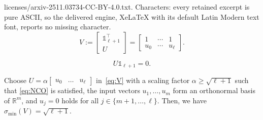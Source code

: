 \documentclass[10pt,a4paper]{amsart}
\newcommand{\R}{\ensuremath{\mathbb R}}
\newcommand{\dd}{\ell}
\newcommand{\one}{\mathds{1}}
\begin{document}
licenses/arxiv-2511.03734-CC-BY-4.0.txt. Characters: every retained excerpt is pure ASCII, so the delivered engine, XeLaTeX with its default Latin Modern text font, reports no missing character.
    \begin{equation}\label{eq:V}
        V := \begin{bmatrix}
            \one_{\dd+1}^\top \\ U
        \end{bmatrix} = \begin{bmatrix}
            1 & \cdots & 1\\
            u_0 & \cdots & u_{\dd} 
    \end{bmatrix}.
    \end{equation}

    \begin{equation}\label{eq:NCO}\tag{NCO}
        U \one_{\dd+1} = 0.
    \end{equation}

\begin{corollary}\label{cor:scaling}
    Choose $U=\alpha\begin{bmatrix}
        u_0&\dots&u_\dd
    \end{bmatrix}$ in~\cref{eq:V} with a scaling factor $\alpha\geq\sqrt{\dd+1}$ such that \eqref{eq:NCO} is satisfied, %
    the input vectors $u_1,\dots,u_m$ form an orthonormal basis of $\R^m$, and $u_j=0$ holds for all $j \in \{m+1,\ldots,\dd\}$.
    Then, we have $\sigma_\mathrm{min}(V)=\sqrt{\dd+1}$.
\end{corollary}
\end{document}
